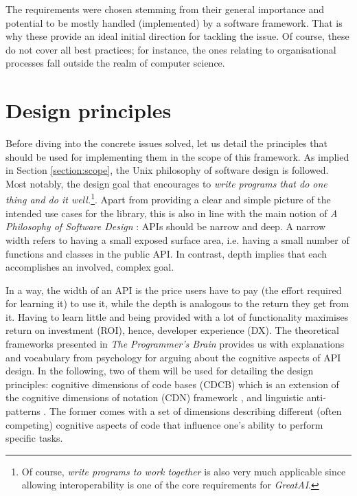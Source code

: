 The requirements were chosen stemming from their general importance and potential to be mostly handled (implemented) by a software framework. That is why these provide an ideal initial direction for tackling the issue. Of course, these do not cover all best practices; for instance, the ones relating to organisational processes fall outside the realm of computer science.

\section{Design principles}

Before diving into the concrete issues solved, let us detail the principles that should be used for implementing them in the scope of this framework. As implied in Section \ref{section:scope}, the Unix philosophy \cite{ritchie1978unix,salus1994quarter} of software design is followed. Most notably, the design goal that encourages to \textit{write programs that do one thing and do it well.}\footnote{Of course, \textit{write programs to work together} is also very much applicable since allowing interoperability is one of the core requirements for \textit{GreatAI}.}. Apart from providing a clear and simple picture of the intended use cases for the library, this is also in line with the main notion of \textit{A Philosophy of Software Design} \cite{ousterhout2018philosophy}: APIs should be narrow and deep. A narrow width refers to having a small exposed surface area, i.e. having a small number of functions and classes in the public API. In contrast, depth implies that each accomplishes an involved, complex goal. 

In a way, the width of an API is the price users have to pay (the effort required for learning it) to use it, while the depth is analogous to the return they get from it. Having to learn little and being provided with a lot of functionality maximises return on investment (ROI), hence, developer experience (DX). The theoretical frameworks presented in \textit{The Programmer's Brain} \cite{hermans2021programmer} provides us with explanations and vocabulary from psychology for arguing about the cognitive aspects of API design. In the following, two of them will be used for detailing the design principles: cognitive dimensions of code bases (CDCB) which is an extension of the cognitive dimensions of notation (CDN) framework \cite{blackwell2001cognitive}, and linguistic anti-patterns \cite{arnaoudova2016linguistic}. The former comes with a set of dimensions describing different (often competing) cognitive aspects of code that influence one's ability to perform specific tasks.

